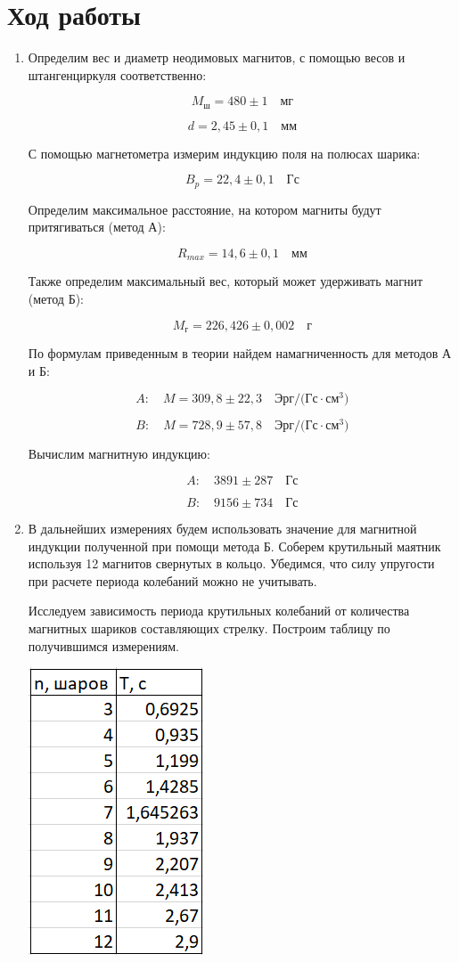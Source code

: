 \documentclass[a4paper,12pt]{article}
\begin{document}
\section*{Ход работы}
\begin{enumerate}
\item Определим вес и диаметр неодимовых магнитов, с помощью весов и штангенциркуля соответственно:

\[M_{\textit{ш}} = 480 \pm 1 \quad \textit{мг}\]

\[d = 2,45 \pm 0,1 \quad \textit{мм}\]

С помощью магнетометра измерим индукцию поля на полюсах шарика:

\[B_p = 22,4 \pm 0,1 \quad \textit{Гс}\]

Определим максимальное расстояние, на котором магниты будут притягиваться (метод А):

\[R_{max} = 14,6 \pm 0,1 \quad \textit{мм} \]

Также определим максимальный вес, который может удерживать магнит (метод Б):

\[M_\textit{г} = 226,426 \pm 0,002 \quad \textit{г}\]

По формулам приведенным в теории найдем намагниченность для методов А и Б:

\[A: \quad M = 309,8 \pm 22,3 \quad \textit{Эрг/(Гс}\cdot \textit{см}^3\textit{)}\]

\[B: \quad M = 728,9 \pm 57,8 \quad \textit{Эрг/(Гс}\cdot \textit{см}^3\textit{)}\]

Вычислим магнитную индукцию:

\[A: \quad 3891 \pm 287 \quad \textit{Гс} \]

\[B: \quad 9156 \pm 734 \quad \textit{Гс} \]

\item В дальнейших измерениях будем использовать значение для магнитной индукции полученной при помощи метода Б. Соберем крутильный маятник используя 12 магнитов свернутых в кольцо. Убедимся, что силу упругости при расчете периода колебаний можно не учитывать.

Исследуем зависимость периода крутильных колебаний от количества магнитных шариков составляющих стрелку. Построим таблицу по получившимся измерениям.

\begin{center}
\includegraphics[scale=0.8]{table1.png}
\end{center}


\end{enumerate}
\end{document}
